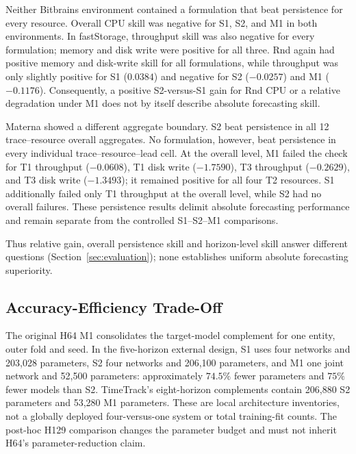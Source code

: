 \documentclass[a4paper,fleqn]{cas-dc}
\begin{document}
Neither Bitbrains environment contained a formulation that beat persistence
for every resource. Overall CPU skill was negative for S1, S2, and M1 in both
environments. In fastStorage, throughput skill was also negative for every
formulation; memory and disk write were positive for all three. Rnd again had
positive memory and disk-write skill for all formulations, while throughput
was only slightly positive for S1 ($0.0384$) and negative for S2 ($-0.0257$)
and M1 ($-0.1176$). Consequently, a positive S2-versus-S1 gain for Rnd CPU or a
relative degradation under M1 does not by itself describe absolute forecasting
skill.

Materna showed a different aggregate boundary. S2 beat persistence in all 12
trace--resource overall aggregates. No formulation, however, beat persistence
in every individual trace--resource--lead cell. At the overall level, M1 failed
the check for T1 throughput ($-0.0608$), T1 disk write ($-1.7590$), T3
throughput ($-0.2629$), and T3 disk write ($-1.3493$); it remained positive for
all four T2 resources. S1 additionally failed only T1 throughput at the overall
level, while S2 had no overall failures. These persistence results delimit
absolute forecasting performance and remain separate from the controlled
S1--S2--M1 comparisons.

Thus relative gain, overall persistence skill and horizon-level skill answer
different questions (Section~\ref{sec:evaluation}); none establishes uniform
absolute forecasting superiority.

\subsection{Accuracy-Efficiency Trade-Off}
\label{sec:results-efficiency}

The original H64 M1 consolidates the target-model complement for one entity,
outer fold and seed. In the five-horizon external design, S1 uses four
networks and 203,028 parameters, S2 four networks and 206,100 parameters, and
M1 one joint network and 52,500 parameters: approximately $74.5\%$ fewer
parameters and $75\%$ fewer models than S2. TimeTrack's eight-horizon
complements contain 206,880 S2 parameters and 53,280 M1 parameters. These
are local architecture inventories, not a globally deployed four-versus-one
system or total training-fit counts. The post-hoc H129 comparison changes
the parameter budget and must not inherit H64's parameter-reduction claim.


\end{document}
